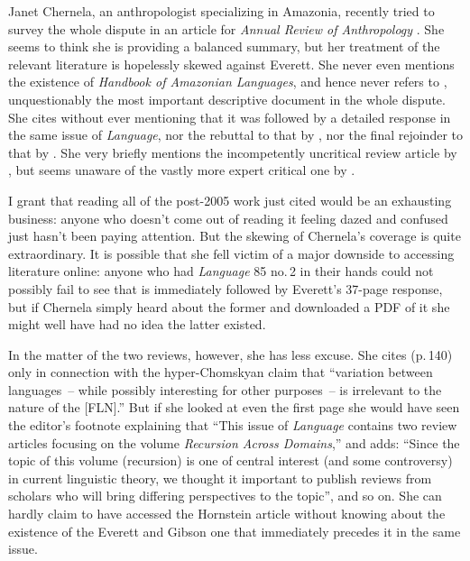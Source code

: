 \documentclass[output=paper,colorlinks,citecolor=brown
]{langscibook}
\begin{document}
Janet Chernela, an anthropologist specializing in Amazonia, recently
tried to survey the whole dispute in an article for \textit{Annual
Review of Anthropology} \citep{Chernela23}. She seems to think she
is providing a balanced summary, but her treatment of the relevant
literature is hopelessly skewed against Everett. She never even
mentions the existence of \textit{Handbook of Amazonian Languages},
and hence never refers to \citet{Everett86HAL}, unquestionably the
most important descriptive document in the whole dispute. She cites
\citet{NevPesRod09a} without ever mentioning that it was followed by
a detailed response \citep{Everett09} in the same issue of
\textit{Language}, nor the rebuttal to that by \citet{NevPesRod09b},
nor the final rejoinder to that by \citet{Everett13}. She very
briefly mentions the incompetently uncritical review article by
\citet{Hornstein19}, but seems unaware of the vastly more expert
critical one by \citet{EverGibs19}.

I grant that reading all of the post-2005 work just cited would be
an exhausting business: anyone who doesn't come out of reading it
feeling dazed and confused just hasn't been paying attention. But
the skewing of Chernela's coverage is quite extraordinary. It is
possible that she fell victim of a major downside to accessing
literature online: anyone who had \textit{Language} 85 no.\,2 in
their hands could not possibly fail to see that \citet{NevPesRod09a}
is immediately followed by Everett's 37-page response, but if Chernela
simply heard about the former and downloaded a PDF of it she might well
have had no idea the latter existed.

In the matter of the two reviews, however, she has less excuse. She
cites \citet{Hornstein19} (p.\,140) only in connection with the
hyper-Chomskyan claim that ``variation between languages~-- while
possibly interesting for other purposes~-- is irrelevant to the nature
of the [FLN].'' But if she looked at even the first page she would have
seen the editor's footnote explaining that ``This issue of
\textit{Language} contains two review articles focusing on the
volume \textit{Recursion Across Domains},'' and adds: ``Since the
topic of this volume (recursion) is one of central interest (and some
controversy) in current linguistic theory, we thought it important
to publish reviews from scholars who will bring differing perspectives
to the topic'', and so on. She can hardly claim to have accessed the
Hornstein article without knowing about the existence of the Everett
and Gibson one that immediately precedes it in the same issue.
\end{document}
